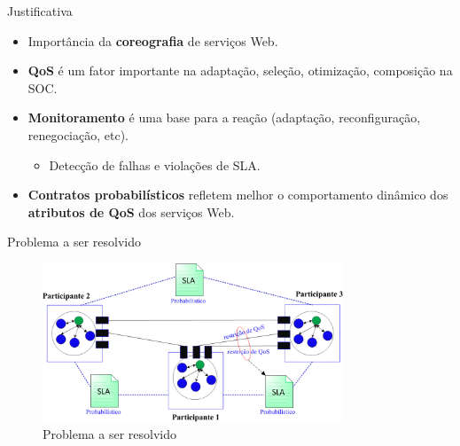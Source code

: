 \documentclass[xcolor=svgnames]{beamer}
\begin{document}
    \begin{frame}{Justificativa}
    	\begin{itemize}
          \item <1->Importância da \textbf{coreografia} de serviços Web.
          \item <2->\textbf{QoS} é um fator importante na adaptação, seleção, otimização, composição na SOC. %
          \item <3->\textbf{Monitoramento} é uma base para a reação (adaptação, reconfiguração, renegociação, etc).
              	\begin{itemize}
                  \item Detecção de falhas e violações de SLA. %
                \end{itemize}
          \item <4->\textbf{Contratos probabilísticos} refletem melhor o comportamento dinâmico dos \textbf{atributos de QoS} dos serviços Web.
    	\end{itemize}
    \end{frame}

    \begin{frame}{Problema a ser resolvido}
      \begin{figure}[!h]
	  \centering
	  \includegraphics[width=0.8\textwidth]{ChoreographySLAs.png}
	  \caption{Problema a ser resolvido}
      \end{figure}	
    \end{frame}





\end{document}
